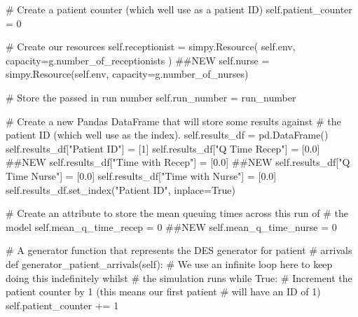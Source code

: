 \documentclass[
  letterpaper,
  DIV=11,
  numbers=noendperiod]{scrreprt}
\newenvironment{Shaded}{\begin{snugshade}}{\end{snugshade}}
\newcommand{\CommentTok}[1]{\textcolor[rgb]{0.37,0.37,0.37}{#1}}
\newcommand{\ControlFlowTok}[1]{\textcolor[rgb]{0.00,0.23,0.31}{#1}}
\newcommand{\DecValTok}[1]{\textcolor[rgb]{0.68,0.00,0.00}{#1}}
\newcommand{\FloatTok}[1]{\textcolor[rgb]{0.68,0.00,0.00}{#1}}
\newcommand{\KeywordTok}[1]{\textcolor[rgb]{0.00,0.23,0.31}{#1}}
\newcommand{\NormalTok}[1]{\textcolor[rgb]{0.00,0.23,0.31}{#1}}
\newcommand{\OperatorTok}[1]{\textcolor[rgb]{0.37,0.37,0.37}{#1}}
\newcommand{\StringTok}[1]{\textcolor[rgb]{0.13,0.47,0.30}{#1}}
\newcommand{\VariableTok}[1]{\textcolor[rgb]{0.07,0.07,0.07}{#1}}
\begin{document}
\begin{tcolorbox}
\begin{Shaded}
\begin{Highlighting}[]
        \CommentTok{\# Create a patient counter (which we\textquotesingle{}ll use as a patient ID)}
        \VariableTok{self}\NormalTok{.patient\_counter }\OperatorTok{=} \DecValTok{0}

        \CommentTok{\# Create our resources}
        \VariableTok{self}\NormalTok{.receptionist }\OperatorTok{=}\NormalTok{ simpy.Resource(}
            \VariableTok{self}\NormalTok{.env, capacity}\OperatorTok{=}\NormalTok{g.number\_of\_receptionists}
\NormalTok{        ) }\CommentTok{\#\#NEW}
        \VariableTok{self}\NormalTok{.nurse }\OperatorTok{=}\NormalTok{ simpy.Resource(}\VariableTok{self}\NormalTok{.env, capacity}\OperatorTok{=}\NormalTok{g.number\_of\_nurses)}

        \CommentTok{\# Store the passed in run number}
        \VariableTok{self}\NormalTok{.run\_number }\OperatorTok{=}\NormalTok{ run\_number}

        \CommentTok{\# Create a new Pandas DataFrame that will store some results against}
        \CommentTok{\# the patient ID (which we\textquotesingle{}ll use as the index).}
        \VariableTok{self}\NormalTok{.results\_df }\OperatorTok{=}\NormalTok{ pd.DataFrame()}
        \VariableTok{self}\NormalTok{.results\_df[}\StringTok{"Patient ID"}\NormalTok{] }\OperatorTok{=}\NormalTok{ [}\DecValTok{1}\NormalTok{]}
        \VariableTok{self}\NormalTok{.results\_df[}\StringTok{"Q Time Recep"}\NormalTok{] }\OperatorTok{=}\NormalTok{ [}\FloatTok{0.0}\NormalTok{] }\CommentTok{\#\#NEW}
        \VariableTok{self}\NormalTok{.results\_df[}\StringTok{"Time with Recep"}\NormalTok{] }\OperatorTok{=}\NormalTok{ [}\FloatTok{0.0}\NormalTok{] }\CommentTok{\#\#NEW}
        \VariableTok{self}\NormalTok{.results\_df[}\StringTok{"Q Time Nurse"}\NormalTok{] }\OperatorTok{=}\NormalTok{ [}\FloatTok{0.0}\NormalTok{]}
        \VariableTok{self}\NormalTok{.results\_df[}\StringTok{"Time with Nurse"}\NormalTok{] }\OperatorTok{=}\NormalTok{ [}\FloatTok{0.0}\NormalTok{]}
        \VariableTok{self}\NormalTok{.results\_df.set\_index(}\StringTok{"Patient ID"}\NormalTok{, inplace}\OperatorTok{=}\VariableTok{True}\NormalTok{)}

        \CommentTok{\# Create an attribute to store the mean queuing times across this run of}
        \CommentTok{\# the model}
        \VariableTok{self}\NormalTok{.mean\_q\_time\_recep }\OperatorTok{=} \DecValTok{0} \CommentTok{\#\#NEW}
        \VariableTok{self}\NormalTok{.mean\_q\_time\_nurse }\OperatorTok{=} \DecValTok{0}

    \CommentTok{\# A generator function that represents the DES generator for patient}
    \CommentTok{\# arrivals}
    \KeywordTok{def}\NormalTok{ generator\_patient\_arrivals(}\VariableTok{self}\NormalTok{):}
        \CommentTok{\# We use an infinite loop here to keep doing this indefinitely whilst}
        \CommentTok{\# the simulation runs}
        \ControlFlowTok{while} \VariableTok{True}\NormalTok{:}
            \CommentTok{\# Increment the patient counter by 1 (this means our first patient}
            \CommentTok{\# will have an ID of 1)}
            \VariableTok{self}\NormalTok{.patient\_counter }\OperatorTok{+=} \DecValTok{1}


\end{Highlighting}
\end{Shaded}
\end{tcolorbox}
\end{document}
